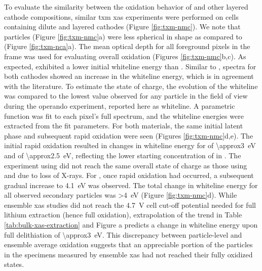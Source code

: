 \documentclass{article}
\begin{document}
To evaluate the similarity between the oxidation behavior of \nca{}
and other layered cathode compositions, similar \gls{txm} \gls{xas}
experiments were performed on cells containing dilute \nmc[333]{} and
\nmc[532]{} layered cathodes (Figure \ref{fig:txm-nmc}). We note that
\nmc{} particles (Figure \ref{fig:txm-nmc}a) were less spherical in
shape as compared to \nca{} (Figure \ref{fig:txm-nca}a). The mean
optical depth for all foreground pixels in the frame was used for
evaluating overall oxidation (Figures \ref{fig:txm-nmc}b,c). As
expected, \nmc[333]{} exhibited a lower initial whiteline energy than
\nca{}\cite{deb2005,muto2009}. Similar to \nca{}, spectra for both
\nmc{} cathodes showed an increase in the whiteline energy, which is
in agreement with the literature\citeme{}. To estimate the state of
charge, the evolution of the whiteline was compared to the lowest
value observed for any particle in the field of view during the
operando experiment, reported here as \textDelta{}whiteline. A
parametric function was fit to each pixel's full spectrum, and the
whiteline energies were extracted from the fit parameters.  For both \nmc{} materials, the same
initial latent phase and subsequent rapid oxidation were seen (Figures
\ref{fig:txm-nmc}d,e). The initial rapid  oxidation resulted in
changes in whiteline energy for \nmc[333]{} of
\SI{\approx3}{\electronvolt} and \nmc[532]{} of
\SI{\approx2.5}{\electronvolt}, reflecting the lower starting
concentration of  in \nmc[532]{}. The experiment using
\nmc[532]{} did not reach the same overall state of charge as those
using \nmc[333]{} and \nca{} due to loss of X-rays. For \nmc[333]{},
once rapid oxidation had occurred, a subsequent gradual increase to
\SI{4.1}{eV} was observed. The total change in whiteline energy for
all observed secondary particles was \SI{>4}{eV} (Figure
\ref{fig:txm-nmc}d). While ensemble \gls{xas}
studies\cite{deb2005,muto2009} did not reach the \SI{4.7}{V} cell
cut-off potential needed for full lithium extraction (hence full
 oxidation), extrapolation of the trend in Table
\ref{tab:bulk-xas-extraction} and Figure
a predicts a change in whiteline
energy upon full delithiation of \SI{\approx3}{eV}. This discrepancy
between particle-level and ensemble average  oxidation suggests
that an appreciable portion of the particles in the specimens measured
by ensemble \gls{xas} had not reached their fully oxidized states.
\end{document}
